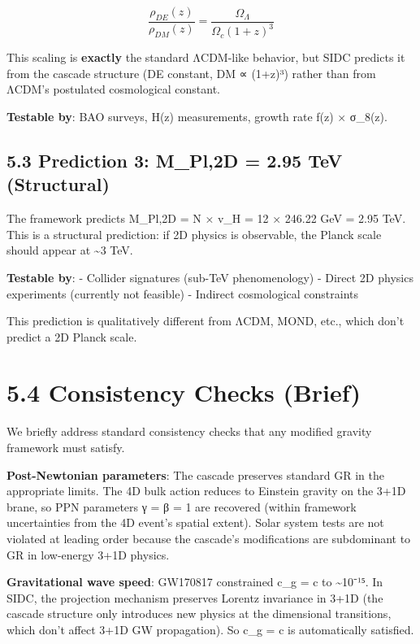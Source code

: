 \[\frac{\rho_{DE}(z)}{\rho_{DM}(z)} = \frac{\Omega_\Lambda}{\Omega_c (1+z)^3}\]

This scaling is \textbf{exactly} the standard ΛCDM-like behavior, but
SIDC predicts it from the cascade structure (DE constant, DM ∝ (1+z)³)
rather than from ΛCDM's postulated cosmological constant.

\textbf{Testable by}: BAO surveys, H(z) measurements, growth rate f(z) ×
σ\_8(z).

\hypertarget{prediction-3-m_pl2d-2.95-tev-structural}{%
\subsection{5.3 Prediction 3: M\_Pl,2D = 2.95 TeV
(Structural)}\label{prediction-3-m_pl2d-2.95-tev-structural}}

The framework predicts M\_Pl,2D = N × v\_H = 12 × 246.22 GeV = 2.95 TeV.
This is a structural prediction: if 2D physics is observable, the Planck
scale should appear at \textasciitilde3 TeV.

\textbf{Testable by}: - Collider signatures (sub-TeV phenomenology) -
Direct 2D physics experiments (currently not feasible) - Indirect
cosmological constraints

This prediction is qualitatively different from ΛCDM, MOND, etc., which
don't predict a 2D Planck scale.

\hypertarget{consistency-checks-brief}{%
\section{5.4 Consistency Checks
(Brief)}\label{consistency-checks-brief}}

We briefly address standard consistency checks that any modified gravity
framework must satisfy.

\textbf{Post-Newtonian parameters}: The cascade preserves standard GR in
the appropriate limits. The 4D bulk action reduces to Einstein gravity
on the 3+1D brane, so PPN parameters γ = β = 1 are recovered (within
framework uncertainties from the 4D event's spatial extent). Solar
system tests are not violated at leading order because the cascade's
modifications are subdominant to GR in low-energy 3+1D physics.

\textbf{Gravitational wave speed}: GW170817 constrained c\_g = c to
\textasciitilde10⁻¹⁵. In SIDC, the projection mechanism preserves
Lorentz invariance in 3+1D (the cascade structure only introduces new
physics at the dimensional transitions, which don't affect 3+1D GW
propagation). So c\_g = c is automatically satisfied.


